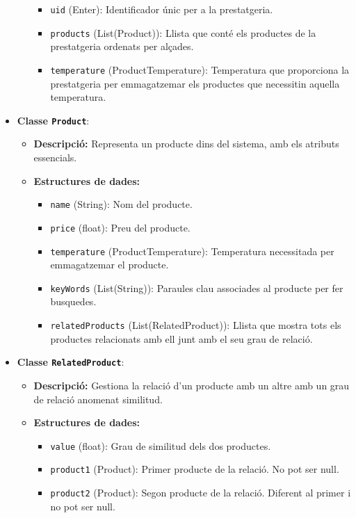 \documentclass[a4paper,12pt]{report}
\begin{document}
\begin{itemize}
\begin{itemize}
\begin{itemize}
				\item \texttt{uid} (Enter): Identificador únic per a la prestatgeria.
				\item \texttt{products} (List(Product)): Llista que conté els productes de la prestatgeria ordenats per alçades.
				\item \texttt{temperature} (ProductTemperature): Temperatura que proporciona la prestatgeria per emmagatzemar els productes que necessitin aquella temperatura.
			\end{itemize}
		\end{itemize}
		\item \textbf{Classe \texttt{Product}}:
		\begin{itemize}
			\item \textbf{Descripció:} Representa un producte dins del sistema, amb els atributs essencials.
			\item \textbf{Estructures de dades:}
			\begin{itemize}
				\item \texttt{name} (String): Nom del producte.
				\item \texttt{price} (float): Preu del producte.
				\item \texttt{temperature} (ProductTemperature): Temperatura necessitada per emmagatzemar el producte.
				\item \texttt{keyWords} (List(String)): Paraules clau associades al producte per fer busquedes.
				\item \texttt{relatedProducts} (List(RelatedProduct)): Llista que mostra tots els productes relacionats amb ell junt amb el seu grau de relació.
			\end{itemize}
		\end{itemize}
		\item \textbf{Classe \texttt{RelatedProduct}}:
		\begin{itemize}
			\item \textbf{Descripció:} Gestiona la relació d'un producte amb un altre amb un grau de relació anomenat similitud.
			\item \textbf{Estructures de dades:}
			\begin{itemize}
				\item \texttt{value} (float): Grau de similitud dels dos productes.
				\item \texttt{product1} (Product): Primer producte de la relació. No pot ser null.
				\item \texttt{product2} (Product): Segon producte de la relació. Diferent al primer i no pot ser null.

\end{itemize}
\end{itemize}
\end{itemize}
\end{document}
